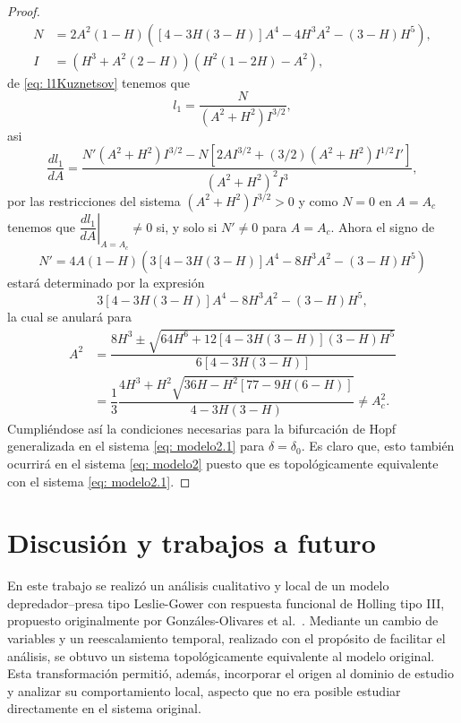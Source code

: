 \documentclass[]{article}
\theoremstyle{remark}
\begin{document}
\begin{proof}
		\begin{equation*}
			\begin{aligned}
				N &= 2A^2(1 - H)([4 - 3H(3 - H)]A^4 -4H^3A^2 - (3 - H)H^5) ,\\
				I &= (H^3 + A^2(2 - H))(H^2(1 - 2H)- A^2),
			\end{aligned}
		\end{equation*}
		de \eqref{eq: l1Kuznetsov} tenemos que $$l_1 = \dfrac{N}{(A^2+H^2)I^{3/2}},$$ asi
		\begin{equation}
			\dfrac{dl_1}{dA} = \dfrac{N' (A^2+H^2) I^{3/2} - N \left[2AI^{3/2} + (3/2)(A^2+H^2) I^{1/2} I' \right]}{(A^2+H^2)^2 I^3},
		\end{equation}
		por las restricciones del sistema $(A^2+H^2) I^{3/2} > 0$ y como $N=0$ en $A=A_c$ tenemos que $\left. \dfrac{d l_1}{dA} \right|_{A=A_c} \neq 0$ si, y solo si $N' \neq 0$ para $A=A_c$. Ahora el signo de
		\begin{equation*}
			N'= 4A(1-H) \left(3[4-3H(3-H)]A^4-8H^3A^2-(3-H)H^5\right)
		\end{equation*}
		estará determinado por la expresión $$3[4-3H(3-H)]A^4-8H^3A^2-(3-H)H^5,$$ la cual se anulará para
		\begin{equation*}
			\begin{aligned}
				A^2 &= \dfrac{8H^3 \pm \sqrt{64 H^6 + 12[4 - 3H(3-H)] (3-H)H^5}}{6[4-3H(3-H)]} \\
				&= \dfrac{1}{3} \dfrac{4H^3 + H^2\sqrt{36H - H^2[77 - 9H(6 - H)]}}{4-3H(3-H)} \neq A^2_c.
			\end{aligned}
		\end{equation*}
		Cumpliéndose así la condiciones necesarias para la bifurcación de Hopf generalizada en el sistema \eqref{eq: modelo2.1} para $\delta=\delta_0$. Es claro que, esto también ocurrirá en el sistema \eqref{eq: modelo2} puesto que es topológicamente equivalente con el sistema \eqref{eq: modelo2.1}.
	\end{proof}
	
\section{Discusión y trabajos a futuro}

En este trabajo se realizó un análisis cualitativo y local de un modelo depredador--presa tipo Leslie-Gower con respuesta funcional de Holling tipo III, propuesto originalmente por Gonzáles-Olivares et al.~\cite{articulo}. Mediante un cambio de variables y un reescalamiento temporal, realizado con el propósito de facilitar el análisis, se obtuvo un sistema topológicamente equivalente al modelo original. Esta transformación permitió, además, incorporar el origen al dominio de estudio y analizar su comportamiento local, aspecto que no era posible estudiar directamente en el sistema original.
\end{document}
